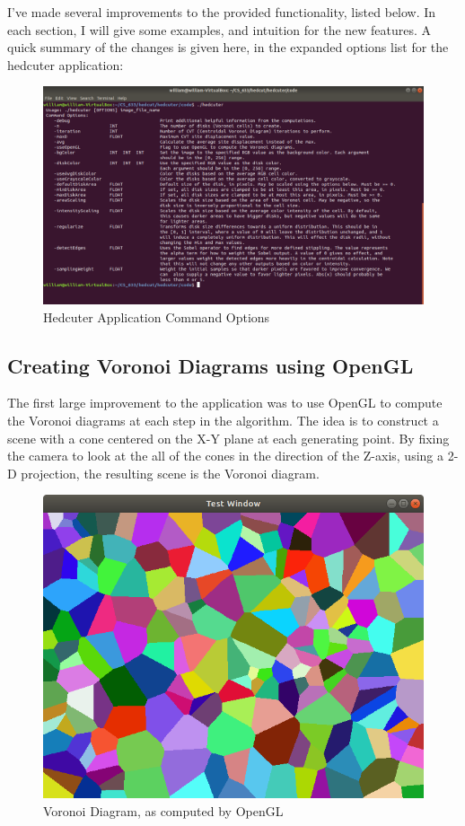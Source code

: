 \documentclass[11pt]{article}
\begin{document}
I've made several improvements to the provided functionality, listed below. In each section, I will give some examples, and intuition for the new features. A quick summary of the changes is given here, in the expanded options list for the hedcuter application:

\begin{figure}[H]
	\centering
	\includegraphics[scale=0.3]{HeducterCommandOptions}
	\caption{Hedcuter Application Command Options}
\end{figure}


\subsection{Creating Voronoi Diagrams using OpenGL}

The first large improvement to the application was to use OpenGL to compute the Voronoi diagrams at each step in the algorithm. The idea is to construct a scene with a cone centered on the X-Y plane at each generating point. By fixing the camera to look at the all of the cones in the direction of the Z-axis, using a 2-D projection, the resulting scene is the Voronoi diagram.

\begin{figure}[H]
	\centering
	\includegraphics[scale=0.35]{VoronoiDiagram}
	\caption{Voronoi Diagram, as computed by OpenGL}
	\label{fig:voronoiDiagram}
\end{figure} 
\end{document}
